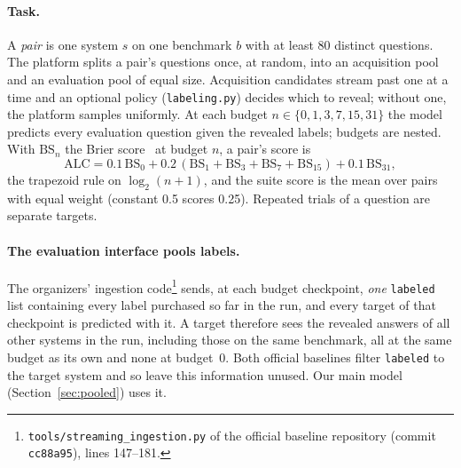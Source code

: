 \documentclass{article}
\newcommand{\code}[1]{\texttt{#1}}
\newcommand{\labeled}{\code{labeled}}
\newcommand{\ALC}{\mathrm{ALC}}
\begin{document}
\paragraph{Task.} A \emph{pair} is one system $s$ on one benchmark $b$ with at least 80 distinct questions. The platform splits a pair's questions once, at random, into an acquisition pool and an evaluation pool of equal size. Acquisition candidates stream past one at a time and an optional policy (\code{labeling.py}) decides which to reveal; without one, the platform samples uniformly. At each budget $n \in \{0,1,3,7,15,31\}$ the model predicts every evaluation question given the revealed labels; budgets are nested. With $\mathrm{BS}_n$ the Brier score~\citep{brier1950} at budget $n$, a pair's score is
\begin{equation}
  \ALC = 0.1\,\mathrm{BS}_0 + 0.2\,(\mathrm{BS}_1 + \mathrm{BS}_3 + \mathrm{BS}_7 + \mathrm{BS}_{15}) + 0.1\,\mathrm{BS}_{31},
\end{equation}
the trapezoid rule on $\log_2(n+1)$, and the suite score is the mean over pairs with equal weight (constant 0.5 scores 0.25). Repeated trials of a question are separate targets.

\paragraph{The evaluation interface pools labels.} The organizers' ingestion code\footnote{\code{tools/streaming\_ingestion.py} of the official baseline repository (commit \code{cc88a95}), lines 147--181.} sends, at each budget checkpoint, \emph{one} \labeled{} list containing every label purchased so far in the run, and every target of that checkpoint is predicted with it. A target therefore sees the revealed answers of all other systems in the run, including those on the same benchmark, all at the same budget as its own and none at budget~0. Both official baselines filter \labeled{} to the target system and so leave this information unused. Our main model (Section~\ref{sec:pooled}) uses it.
\end{document}
